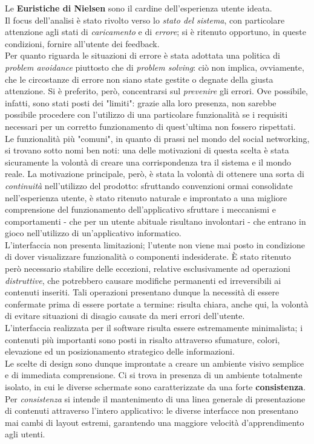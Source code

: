 \documentclass{natourDoc}
\begin{document}
Le \textbf{Euristiche di Nielsen} sono il cardine dell'esperienza utente ideata. \\
Il focus dell'analisi è stato rivolto verso lo \textit{stato del sistema}, con particolare attenzione agli stati di \textit{caricamento} e di \textit{errore}; 
si è ritenuto opportuno, in queste condizioni, fornire all'utente dei feedback. \\
Per quanto riguarda le situazioni di errore è stata adottata una politica di \textit{problem avoidance} piuttosto che di \textit{problem solving}: ciò non implica, 
ovviamente, che le circostanze di errore non siano state gestite o degnate della giusta attenzione. Si è preferito, però, concentrarsi sul \textit{prevenire} gli errori. 
Ove possibile, infatti, sono stati posti dei "limiti": grazie alla loro presenza, non sarebbe possibile procedere con l'utilizzo di una particolare funzionalità se 
i requisiti necessari per un corretto funzionamento di quest'ultima non fossero rispettati. \\
Le funzionalità più "comuni", in quanto di prassi nel mondo del social networking, si trovano sotto nomi ben noti: una delle motivazioni di questa scelta è stata sicuramente la volontà di 
creare una corrispondenza tra il sistema e il mondo reale. La motivazione principale, però, è stata la volontà di ottenere una sorta di \textit{continuità} nell'utilizzo del prodotto: sfruttando convenzioni ormai 
consolidate nell'esperienza utente, è stato ritenuto naturale e improntato a una migliore comprensione del funzionamento dell'applicativo sfruttare i meccanismi 
 e comportamenti - che per un utente abituale risultano involontari - che entrano in gioco nell'utilizzo di un'applicativo informatico. \\
L'interfaccia non presenta limitazioni; l'utente non viene mai posto in condizione di dover visualizzare funzionalità o componenti indesiderate. 
È stato ritenuto però necessario stabilire delle eccezioni, relative esclusivamente ad operazioni \textit{distruttive}, che potrebbero causare modifiche permanenti ed irreversibili 
ai contenuti inseriti. Tali operazioni presentano dunque la necessità di essere confermate prima di essere portate a termine: risulta chiara, anche qui, la volontà di evitare 
situazioni di disagio causate da meri errori dell'utente.\\
L'interfaccia realizzata per il software risulta essere estremamente minimalista; i contenuti più importanti sono posti in risalto attraverso sfumature, colori, elevazione ed un 
posizionamento strategico delle informazioni. \\ 
Le scelte di design sono dunque improntate a creare un ambiente visivo semplice e di immediata comprensione. 
Ci si trova in presenza di un ambiente totalmente isolato, in cui le diverse schermate sono caratterizzate da una forte 
\textbf{consistenza}. Per \textit{consistenza} si intende il mantenimento di una linea generale di presentazione di contenuti attraverso 
l'intero applicativo: le diverse interfacce non presentano mai cambi di layout estremi, garantendo una maggiore velocità d'apprendimento agli utenti. \\
\end{document}
